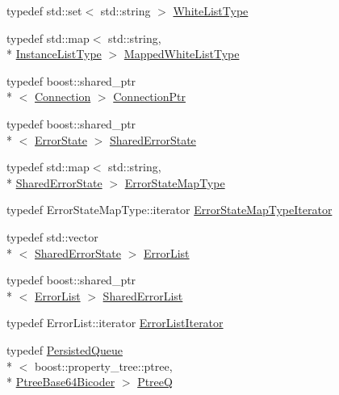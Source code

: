 \begin{DoxyCompactItemize}
\item 
typedef std\-::set$<$ std\-::string $>$ \hyperlink{namespacekisscpp_a6aa00ccbe46e3a892fa90d3fbf6e3439}{White\-List\-Type}
\item 
typedef std\-::map$<$ std\-::string, \\*
\hyperlink{structkisscpp_1_1_instance_list_type}{Instance\-List\-Type} $>$ \hyperlink{namespacekisscpp_a33979b59a2b404e85c9416071d843412}{Mapped\-White\-List\-Type}
\item 
typedef boost\-::shared\-\_\-ptr\\*
$<$ \hyperlink{classkisscpp_1_1_connection}{Connection} $>$ \hyperlink{namespacekisscpp_a4632e92aebdc8fa1c220da260469cbb2}{Connection\-Ptr}
\item 
typedef boost\-::shared\-\_\-ptr\\*
$<$ \hyperlink{classkisscpp_1_1_error_state}{Error\-State} $>$ \hyperlink{namespacekisscpp_af77de115307b379cbcab83a1fc54fdad}{Shared\-Error\-State}
\item 
typedef std\-::map$<$ std\-::string, \\*
\hyperlink{namespacekisscpp_af77de115307b379cbcab83a1fc54fdad}{Shared\-Error\-State} $>$ \hyperlink{namespacekisscpp_ab99725cc511536c050d9cab582313d0c}{Error\-State\-Map\-Type}
\item 
typedef Error\-State\-Map\-Type\-::iterator \hyperlink{namespacekisscpp_a37b3f68e4626dc05d9d2381803a889b4}{Error\-State\-Map\-Type\-Iterator}
\item 
typedef std\-::vector\\*
$<$ \hyperlink{namespacekisscpp_af77de115307b379cbcab83a1fc54fdad}{Shared\-Error\-State} $>$ \hyperlink{namespacekisscpp_aa2a0b418a2607a322f2f821cdfe30c29}{Error\-List}
\item 
typedef boost\-::shared\-\_\-ptr\\*
$<$ \hyperlink{namespacekisscpp_aa2a0b418a2607a322f2f821cdfe30c29}{Error\-List} $>$ \hyperlink{namespacekisscpp_a97f51b10e50fc4e1f9142a9e909d477b}{Shared\-Error\-List}
\item 
typedef Error\-List\-::iterator \hyperlink{namespacekisscpp_a0e777bb04ad695eccf10fe83263ef220}{Error\-List\-Iterator}
\item 
typedef \hyperlink{classkisscpp_1_1_persisted_queue}{Persisted\-Queue}\\*
$<$ boost\-::property\-\_\-tree\-::ptree, \\*
\hyperlink{classkisscpp_1_1_ptree_base64_bicoder}{Ptree\-Base64\-Bicoder} $>$ \hyperlink{namespacekisscpp_af1d6724570f46ac378171bd45ddf6903}{Ptree\-Q}

\end{DoxyCompactItemize}
